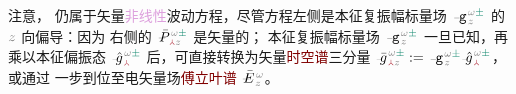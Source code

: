 注意， 仍属于矢量\textcolor{Plum}{非线性}波动方程，尽管方程左侧是\textcolor{PineGreen}{本征复振幅}标量场 $\Xint{\begin{smallmatrix} ~ \\ {}^{}_{\mathcolor{gray}{-}} \\ ~ \end{smallmatrix}}{09}{\mathtt{g}}^{\;\!\mathcolor{gray}{\omega} \textcolor{PineGreen}{\pm}}_{\;\! \mathcolor{gray}{z}}$ 的 $\mathcolor{gray}{z}$ 向偏导：因为 {\one} 右侧的 $\Xint{\mathcolor{gray}{-}}{25}{\bar{P}}^{\;\! \mathcolor{gray}{\omega} \textcolor{PineGreen}{\pm}}_{\;\! \textcolor{Maroon}{\Yup} \mathcolor{gray}{z}}$ 是矢量的；{\two} \textcolor{PineGreen}{本征复振幅}标量场 $\Xint{\begin{smallmatrix} ~ \\ {}^{}_{\mathcolor{gray}{-}} \\ ~ \end{smallmatrix}}{09}{\mathtt{g}}^{\;\!\mathcolor{gray}{\omega} \textcolor{PineGreen}{\pm}}_{\;\! \mathcolor{gray}{z}}$ 一旦已知，再乘以\textcolor{PineGreen}{本征偏振态} $\Xint{{}^{}_{\mathcolor{gray}{-}}}{10}{\hat{g}}^{\;\!\mathcolor{gray}{\omega} \textcolor{PineGreen}{\pm}}_{\;\! \textcolor{Maroon}{\Yup}}$ 后，可直接转换为矢量\textcolor{Maroon}{时空谱}三分量 $\Xint{{}^{}_{\mathcolor{gray}{-}}}{10}{\bar{g}}^{\;\!\mathcolor{gray}{\omega} \textcolor{PineGreen}{\pm}}_{\;\! \textcolor{Maroon}{\Yup} \mathcolor{gray}{z}} := \Xint{\begin{smallmatrix} ~ \\ {}^{}_{\mathcolor{gray}{-}} \\ ~ \end{smallmatrix}}{09}{\mathtt{g}}^{\;\!\mathcolor{gray}{\omega} \textcolor{PineGreen}{\pm}}_{\;\! \mathcolor{gray}{z}} \Xint{{}^{}_{\mathcolor{gray}{-}}}{10}{\hat{g}}^{\;\!\mathcolor{gray}{\omega} \textcolor{PineGreen}{\pm}}_{\;\! \textcolor{Maroon}{\Yup}}$，或通过  一步到位至电矢量场\textcolor{Maroon}{傅立叶谱} $\Xint{\mathcolor{gray}{-}}{25}{\bar{E}}^{\;\!\mathcolor{gray}{\omega}}_{\;\! \mathcolor{gray}{z}}$。

